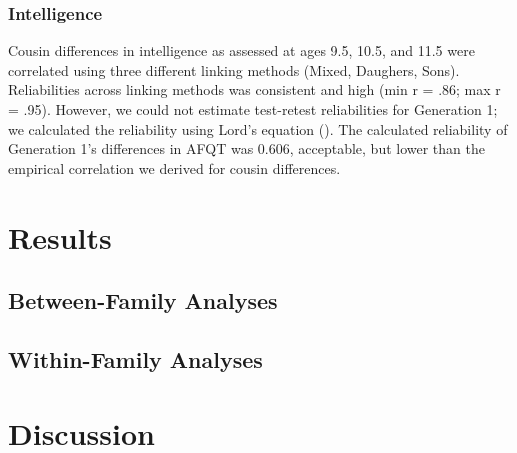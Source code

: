 \documentclass[a4paper,man,apacite,natbib,12pt,longtable]{apa6}\usepackage[]{graphicx}\usepackage[]{color}
\begin{document}
\subsubsection{Intelligence} Cousin differences in intelligence as assessed at ages 9.5, 10.5, and 11.5 were correlated using three different linking methods (Mixed, Daughers, Sons). Reliabilities across linking methods was consistent and high (min r = .86; max r = .95). However, we could not estimate test-retest reliabilities for Generation 1; we calculated the reliability using Lord's equation (\citeyear{Lord1963}). The calculated reliability of Generation 1's differences in AFQT was 0.606, acceptable, but lower than the empirical correlation we derived for cousin differences.

\section{Results}

%
\subsection{Between-Family Analyses}

%
\subsection{Within-Family Analyses}

%
\section{Discussion}

\end{document}
